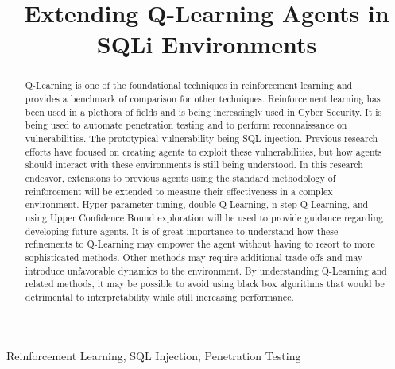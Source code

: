 \documentclass[conference]{IEEEtran}
\begin{document}
 
\title{Extending Q-Learning Agents in SQLi Environments}

\author{
}

\maketitle

\begin{abstract}
Q-Learning is one of the foundational techniques in reinforcement learning and provides a benchmark of comparison for other techniques. Reinforcement learning has been used in a plethora of fields and is being increasingly used in Cyber Security. It is being used to automate penetration testing and to perform reconnaissance on vulnerabilities.  The prototypical vulnerability being SQL injection. Previous research efforts have focused on creating agents to exploit these vulnerabilities, but how agents should interact with these environments is still being understood. In this research endeavor, extensions to previous agents using the standard methodology of reinforcement will be extended to measure their effectiveness in a complex environment. Hyper parameter tuning, double Q-Learning, n-step Q-Learning, and using Upper Confidence Bound exploration will be used to provide guidance regarding developing future agents. It is of great importance to understand how these refinements to Q-Learning may empower the agent without having to resort to more sophisticated methods. Other methods may require additional trade-offs and may introduce unfavorable dynamics to the environment. By understanding Q-Learning and related methods, it may be possible to avoid using black box algorithms that would be detrimental to interpretability while still increasing performance.  
\end{abstract}

\begin{IEEEkeywords}
Reinforcement Learning, SQL Injection, Penetration Testing 
\end{IEEEkeywords}
\end{document}
